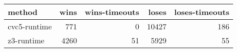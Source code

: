 \begin{tabular}{lrrrr}
\hline
 method       &   wins &   wins-timeouts &   loses &   loses-timeouts \\
\hline
 cvc5-runtime &    771 &               0 &   10427 &              186 \\
 z3-runtime   &   4260 &              51 &    5929 &               55 \\
\hline
\end{tabular}
